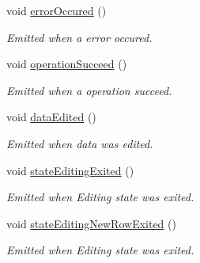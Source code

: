 \begin{DoxyCompactItemize}
void \hyperlink{classmdt_abstract_sql_table_controller_a2cafd348eecc77f2fc0dc05a1a1e69c0}{error\-Occured} ()
\begin{DoxyCompactList}\small\item\em Emitted when a error occured. \end{DoxyCompactList}\item 
void \hyperlink{classmdt_abstract_sql_table_controller_af121cc90bfaf940f1a6a10c5c5a7c7bb}{operation\-Succeed} ()
\begin{DoxyCompactList}\small\item\em Emitted when a operation succeed. \end{DoxyCompactList}\item 
void \hyperlink{classmdt_abstract_sql_table_controller_afa4068a87a3c53a290835115a863f51b}{data\-Edited} ()
\begin{DoxyCompactList}\small\item\em Emitted when data was edited. \end{DoxyCompactList}\item 
void \hyperlink{classmdt_abstract_sql_table_controller_ac164ad9f43047cb2e5c70c2418bd9eb6}{state\-Editing\-Exited} ()
\begin{DoxyCompactList}\small\item\em Emitted when Editing state was exited. \end{DoxyCompactList}\item 
void \hyperlink{classmdt_abstract_sql_table_controller_a4fd23a5a2aa859671adc19568f856c36}{state\-Editing\-New\-Row\-Exited} ()
\begin{DoxyCompactList}\small\item\em Emitted when Editing state was exited. \end{DoxyCompactList}\end{DoxyCompactItemize}
